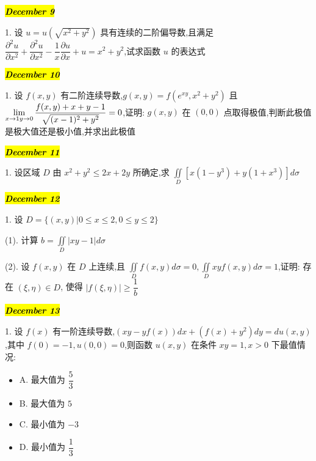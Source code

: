 \hl{\textbf{\textit{December 9}}}

1. 设 $u=u(\sqrt{x^{2}+y^{2}})$ 具有连续的二阶偏导数,且满足 $\dfrac{\partial^{2} u}{\partial x^{2}}+\dfrac{\partial^{2} u}{\partial x^{2}}-\dfrac{1}{x}\dfrac{\partial u}{\partial x}+u=x^{2}+y^{2}$,试求函数 $u$ 的表达式 
\begin{solution}
	
\end{solution}

\hl{\textbf{\textit{December 10}}}

1. 设 $f(x,y)$ 有二阶连续导数,$g(x,y)=f(e^{xy},x^{2}+y^{2})$ 且 $\lim\limits_{x\to 1\\y\to 0}\dfrac{f(x,y)+x+y-1}{\sqrt{(x-1)^{2}+y^{2}}}=0$,证明: $g(x,y)$ 在 $(0,0)$ 点取得极值,判断此极值是极大值还是极小值,并求出此极值
\begin{solution}
	
\end{solution}

\hl{\textbf{\textit{December 11}}}

1. 设区域 $D$ 由 $x^{2}+y^{2}\leq 2x+2y$ 所确定,求 $\iint\limits_{D}[x(1-y^{3})+y(1+x^{3})]d\sigma$
\begin{solution}
	
\end{solution}

\hl{\textbf{\textit{December 12}}}

1. 设 $D=\{(x,y)|0\leq x\leq 2,0\leq y\leq 2\}$

(1). 计算 $b=\iint\limits_{D}|xy-1|d\sigma$

(2). 设 $f(x,y)$ 在 $D$ 上连续,且 $\iint\limits_{D}f(x,y)d\sigma=0,\iint\limits_{D}xyf(x,y)d\sigma=1$,证明: 存在 $(\xi,\eta)\in D$, 使得 $|f(\xi,\eta)|\geq \dfrac{1}{b}$
\begin{solution}
	
\end{solution}

\hl{\textbf{\textit{December 13}}}

1. 设 $f(x)$ 有一阶连续导数,$(xy-yf(x))dx+(f(x)+y^{2})dy=du(x,y)$,其中 $f(0)=-1,u(0,0)=0$,则函数 $u(x,y)$ 在条件 $xy=1,x>0$ 下最值情况:
\begin{itemize}
	\item A. 最大值为 $\dfrac{5}{3}$
	\item B. 最大值为 $5$
	\item C. 最小值为 $-3$
	\item D. 最小值为 $\dfrac{1}{3}$
\end{itemize}
\begin{solution}
	
\end{solution}

